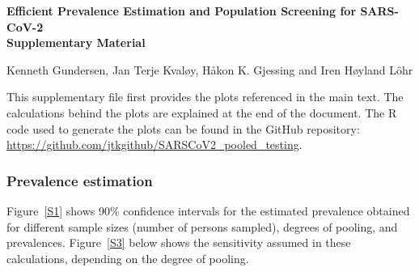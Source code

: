 \documentclass[10pt]{article}
\begin{document}
\begin{center}
{\large \bf  Efficient Prevalence Estimation and Population Screening for SARS-CoV-2\\\vspace*{0.4cm} Supplementary Material  }                           
\end{center}

\centerline {Kenneth Gundersen, Jan Terje Kvaløy, Håkon K. Gjessing and Iren  Høyland Löhr} 

\vspace*{8mm}

This supplementary file first provides the plots referenced in the main text. The calculations behind the plots are explained at the end of the document. The R code used to generate the plots can be found in the GitHub repository: 
\url{https://github.com/jtkgithub/SARSCoV2_pooled_testing}.    

\subsubsection*{Prevalence estimation}

Figure~\ref{S1} shows 90\% confidence intervals for the estimated prevalence obtained for different sample sizes (number of persons sampled), degrees of pooling, and prevalences. Figure~\ref{S3} below shows the sensitivity assumed in these calculations, depending on the degree of pooling.
 
\end{document}
